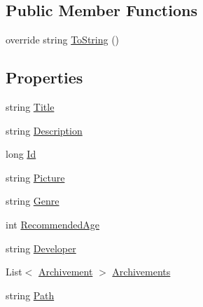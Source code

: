 \subsection*{Public Member Functions}
\begin{DoxyCompactItemize}
\item 
override string \hyperlink{class_damp_server_1_1_game_a25e0b7ef75915876df105cbcacde73c4}{To\-String} ()
\end{DoxyCompactItemize}
\subsection*{Properties}
\begin{DoxyCompactItemize}
\item 
string \hyperlink{class_damp_server_1_1_game_a5c1efa7c9c5020a797116a0913e536b9}{Title}
\item 
string \hyperlink{class_damp_server_1_1_game_afe5ba467625ea46f365aca09bad68947}{Description}
\item 
long \hyperlink{class_damp_server_1_1_game_a26a7f270fc8e2d00bc6200dadcf73477}{Id}
\item 
string \hyperlink{class_damp_server_1_1_game_a29a550376f14967880bfc526015ccf0b}{Picture}
\item 
string \hyperlink{class_damp_server_1_1_game_a0cad62e6865f37362b15cf6e7099d760}{Genre}
\item 
int \hyperlink{class_damp_server_1_1_game_a06678034e2189af84043d880debefd8e}{Recommended\-Age}
\item 
string \hyperlink{class_damp_server_1_1_game_ace54b747f70c31b6be58801d12c968ea}{Developer}
\item 
List$<$ \hyperlink{class_damp_server_1_1_archivement}{Archivement} $>$ \hyperlink{class_damp_server_1_1_game_a614273f71ed4385eba730c5e81291943}{Archivements}
\item 
string \hyperlink{class_damp_server_1_1_game_a1dd8dbbdd5596923b8858517a5f85a30}{Path}
\end{DoxyCompactItemize}
